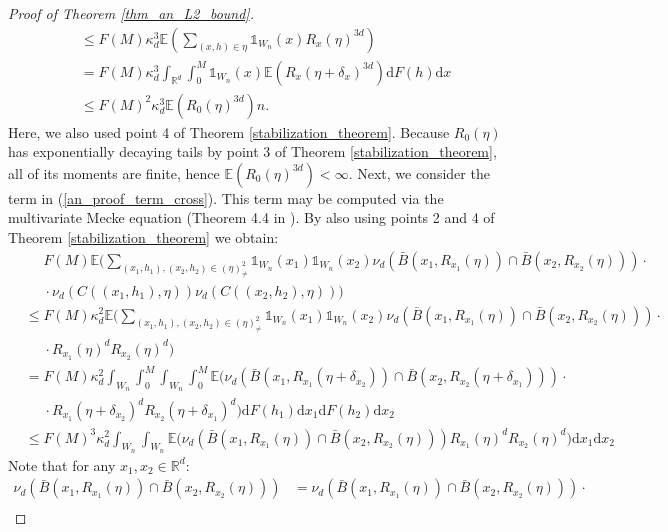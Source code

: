 \documentclass{article}
\newcommand{\RR}{\mathbb{R}}
\newcommand{\EE}{\mathbb{E}}
\theoremstyle{plain}
\theoremstyle{remark}
\theoremstyle{definition}
\begin{document}
\begin{proof}[Proof of Theorem \ref{thm_an_L2_bound}]
\begin{align}
        &\leq F(M)\kappa_d^3 \EE\left(\sum_{(x,h) \in \eta}\mathds{1}_{W_n}(x)R_x(\eta)^{3d}\right) \nonumber\\
        &= F(M)\kappa_d^3\int_{\RR^d}\int_0^M\mathds{1}_{W_n}(x)\EE(R_x(\eta+\delta_x)^{3d}) \mathrm{d}F(h)\mathrm{d}x \nonumber\\
        &\leq F(M)^2\kappa_d^3\EE\left(R_0(\eta)^{3d}\right)n. \label{an_proof_bound2}
    \end{align}
    Here, we also used point 4 of Theorem \ref{stabilization_theorem}. Because $R_0(\eta)$ has exponentially decaying tails by point 3 of Theorem \ref{stabilization_theorem}, all of its moments are finite, hence $\EE(R_0(\eta)^{3d}) < \infty$. Next, we consider the term in (\ref{an_proof_term_cross}). This term may be computed via the multivariate Mecke equation (Theorem 4.4 in \cite{Last2018}). By also using points 2 and 4 of Theorem \ref{stabilization_theorem} we obtain:
{\allowdisplaybreaks
    \begin{align}
        &\phantom{=}F(M) \EE\Bigg(\sum_{(x_1,h_1),(x_2,h_2) \in (\eta)_{\neq}^2}\mathds{1}_{W_n}(x_1)\mathds{1}_{W_n}(x_2)\nu_d(\bar{B}(x_1,R_{x_1}(\eta))\cap\bar{B}(x_2,R_{x_2}(\eta)))\cdot \nonumber\\
        &\phantom{=}\cdot\nu_d(C((x_1,h_1),\eta))\nu_d(C((x_2,h_2),\eta)) \Bigg)\nonumber\\
        &\leq F(M)\kappa_d^2\EE\Bigg(\sum_{(x_1,h_1),(x_2,h_2) \in (\eta)_{\neq}^2}\mathds{1}_{W_n}(x_1)\mathds{1}_{W_n}(x_2)\nu_d(\bar{B}(x_1,R_{x_1}(\eta))\cap\bar{B}(x_2,R_{x_2}(\eta)))\cdot \nonumber\\
        &\phantom{=}\cdot R_{x_1}(\eta)^d  R_{x_2}(\eta)^d \Bigg)\nonumber\\
        &= F(M)\kappa_d^2 \int_{W_n}\int_0^M \int_{W_n}\int_0^M \EE\Bigg(\nu_d(\bar{B}(x_1,R_{x_1}(\eta + \delta_{x_2}))\cap\bar{B}(x_2,R_{x_2}(\eta + \delta_{x_1})))\cdot\nonumber \\
        &\phantom{=}\cdot R_{x_1}(\eta + \delta_{x_2})^d  R_{x_2}(\eta+ \delta_{x_1})^d \Bigg)\mathrm{d}F(h_1)\mathrm{d}x_1\mathrm{d}F(h_2)\mathrm{d}x_2\nonumber\\
        &\leq F(M)^3\kappa_d^2 \int_{W_n}\int_{W_n} \EE\Bigg(\nu_d(\bar{B}(x_1,R_{x_1}(\eta))\cap\bar{B}(x_2,R_{x_2}(\eta))) R_{x_1}(\eta)^d  R_{x_2}(\eta)^d \Bigg)\mathrm{d}x_1\mathrm{d}x_2 \label{an_proof_cross_part2} 
    \end{align}}%
    Note that for any $x_1,x_2 \in \RR^d$:
    \begin{align*}
        \nu_d(\bar{B}(x_1,R_{x_1}(\eta))\cap\bar{B}(x_2,R_{x_2}(\eta))) &= \nu_d(\bar{B}(x_1,R_{x_1}(\eta))\cap\bar{B}(x_2,R_{x_2}(\eta))) \cdot \\

\end{align*}
\end{proof}
\end{document}
